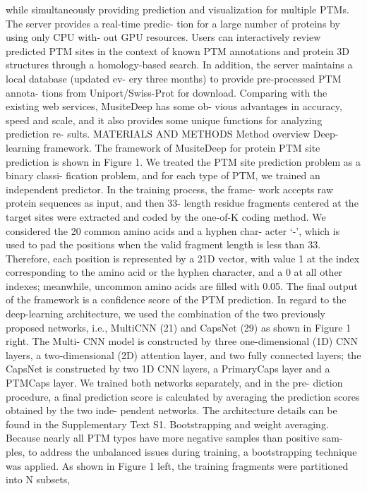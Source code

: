 while simultaneously providing prediction and visualization
for multiple PTMs. The server provides a real-time predic-
tion for a large number of proteins by using only CPU with-
out GPU resources. Users can interactively review predicted
PTM sites in the context of known PTM annotations and
protein 3D structures through a homology-based search. In
addition, the server maintains a local database (updated ev-
ery three months) to provide pre-processed PTM annota-
tions from Uniport/Swiss-Prot for download. Comparing
with the existing web services, MusiteDeep has some ob-
vious advantages in accuracy, speed and scale, and it also
provides some unique functions for analyzing prediction re-
sults.
MATERIALS AND METHODS
Method overview
Deep-learning framework.
The framework of MusiteDeep
for protein PTM site prediction is shown in Figure 1. We
treated the PTM site prediction problem as a binary classi-
fication problem, and for each type of PTM, we trained an
independent predictor. In the training process, the frame-
work accepts raw protein sequences as input, and then 33-
length residue fragments centered at the target sites were
extracted and coded by the one-of-K coding method. We
considered the 20 common amino acids and a hyphen char-
acter ‘-’, which is used to pad the positions when the valid
fragment length is less than 33. Therefore, each position
is represented by a 21D vector, with value 1 at the index
corresponding to the amino acid or the hyphen character,
and a 0 at all other indexes; meanwhile, uncommon amino
acids are filled with 0.05. The final output of the framework
is a confidence score of the PTM prediction. In regard to
the deep-learning architecture, we used the combination of
the two previously proposed networks, i.e., MultiCNN (21)
and CapsNet (29) as shown in Figure 1 right. The Multi-
CNN model is constructed by three one-dimensional (1D)
CNN layers, a two-dimensional (2D) attention layer, and
two fully connected layers; the CapsNet is constructed by
two 1D CNN layers, a PrimaryCaps layer and a PTMCaps
layer. We trained both networks separately, and in the pre-
diction procedure, a final prediction score is calculated by
averaging the prediction scores obtained by the two inde-
pendent networks. The architecture details can be found in
the Supplementary Text S1.
Bootstrapping and weight averaging.
Because nearly all
PTM types have more negative samples than positive sam-
ples, to address the unbalanced issues during training, a
bootstrapping technique was applied. As shown in Figure 1
left, the training fragments were partitioned into N subsets,
